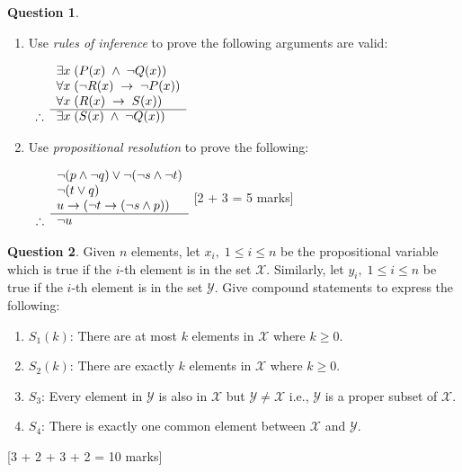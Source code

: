 \documentclass[a4paper]{article}
\theoremstyle{definition}
\newtheorem{question}{Question}
\newcommand{\qmarks}[1]{{\hspace*{\fill} [#1 marks]}}
\begin{document}
\begin{question}\
    \begin{enumerate}
	\item Use \textit{rules of inference} to prove the following arguments are valid:

		  $\begin{array}{rl}
			& \exists x \; (P(x) \; \land \; \lnot Q(x)) \\
			& \forall x \; (\lnot R(x) \; \rightarrow \; \lnot P(x)) \\
			& \forall x \; (R(x) \; \rightarrow \; S(x)) \\
			\cline{2-2}
            \therefore & \exists x \; (S(x) \; \land \; \lnot Q(x)) \\
		  \end{array}$

	  \item Use \textit{propositional resolution} to prove the following:

		  $\begin{array}{rl}
			& \lnot(p \land \lnot q) \lor \lnot(\lnot s \land \lnot t) \\
			& \lnot (t \lor q) \\
			& u \rightarrow (\lnot t \rightarrow (\lnot s \land p))\\
			\cline{2-2}
			\therefore & \lnot u \\
		  \end{array}$
    \qmarks{2 + 3 = 5} %
    \end{enumerate}
\end{question}

\begin{question}
    Given $n$ elements, let $x_i, \; 1 \le i \le n$ be the propositional variable which is true if the $i$-th element is in the set $\mathcal{X}$.
    Similarly, let $y_i, \; 1 \le i \le n$ be true if the $i$-th element is in the set $\mathcal{Y}$.
    Give compound statements to express the following:

    \begin{enumerate}
	\item $S_1(k)$: There are at most $k$ elements in $\mathcal{X}$ where $k \ge 0$.
	\item $S_2(k)$: There are exactly $k$ elements in $\mathcal{X}$ where $k \ge 0$.
	\item $S_3$: Every element in $\mathcal{Y}$ is also in $\mathcal{X}$ but $\mathcal{Y} \neq \mathcal{X}$ i.e., $\mathcal{Y}$ is a proper subset of $\mathcal{X}$.
	\item $S_4$: There is exactly one common element between $\mathcal{X}$ and $\mathcal{Y}$.
    \end{enumerate}
    \qmarks{3 + 2 + 3 + 2 = 10}
\end{question}
\end{document}
